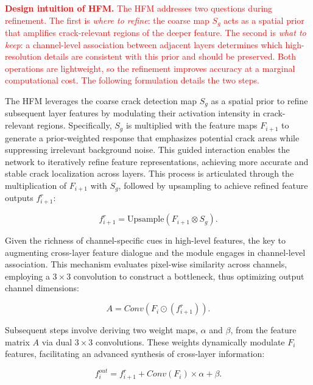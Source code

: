 \documentclass[journal]{IEEEtran}
\begin{document}
\textcolor{red}{\textbf{Design intuition of HFM.} The HFM addresses two questions during refinement. The first is \emph{where to refine}: the coarse map $S_g$ acts as a spatial prior that amplifies crack-relevant regions of the deeper feature. The second is \emph{what to keep}: a channel-level association between adjacent layers determines which high-resolution details are consistent with this prior and should be preserved. Both operations are lightweight, so the refinement improves accuracy at a marginal computational cost. The following formulation details the two steps.}

The HFM leverages the coarse crack detection map $S_g$ as a spatial prior to refine subsequent layer features by modulating their activation intensity in crack-relevant regions. 
Specifically, $S_g$ is multiplied with the feature maps $F_{i+1}$ to generate a prior-weighted response that emphasizes potential crack areas while suppressing irrelevant background noise. 
This guided interaction enables the network to iteratively refine feature representations, achieving more accurate and stable crack localization across layers.
This process is articulated through the multiplication of $F_{i+1}$ with $S_g$, followed by upsampling to achieve refined feature outputs $f^r_{i+1}$:



\begin{equation}
f^r_{i+1} = \text{Upsample}(F_{i+1} \otimes S_g).
\end{equation}

Given the richness of channel-specific cues in high-level features, the key to augmenting cross-layer feature dialogue and the module engages in channel-level association. This mechanism evaluates pixel-wise similarity across channels, employing a $3 \times 3$ convolution to construct a bottleneck, thus optimizing output channel dimensions:

\begin{equation}
A = Conv(F_{i} \odot (f^r_{i+1})).
\end{equation}

Subsequent steps involve deriving two weight maps, $\alpha$ and $\beta$, from the feature matrix $A$ via dual $3 \times 3$ convolutions. These weights dynamically modulate $F_{i}$ features, facilitating an advanced synthesis of cross-layer information:

\begin{equation}
f^{out}_{i} = f^r_{i+1} + Conv(F_{i}) \times \alpha + \beta.
\end{equation}
\end{document}
